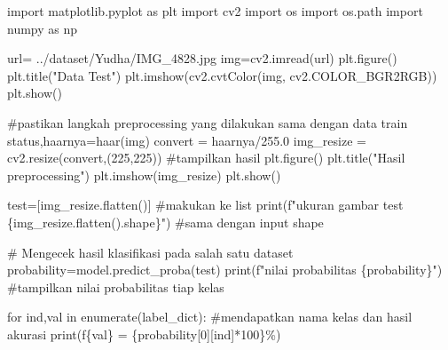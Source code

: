 \documentclass[
  letterpaper,
  DIV=11,
  numbers=noendperiod]{scrreprt}
\newenvironment{Shaded}{\begin{snugshade}}{\end{snugshade}}
\newcommand{\BuiltInTok}[1]{\textcolor[rgb]{0.00,0.23,0.31}{#1}}
\newcommand{\CommentTok}[1]{\textcolor[rgb]{0.37,0.37,0.37}{#1}}
\newcommand{\ControlFlowTok}[1]{\textcolor[rgb]{0.00,0.23,0.31}{#1}}
\newcommand{\DecValTok}[1]{\textcolor[rgb]{0.68,0.00,0.00}{#1}}
\newcommand{\FloatTok}[1]{\textcolor[rgb]{0.68,0.00,0.00}{#1}}
\newcommand{\ImportTok}[1]{\textcolor[rgb]{0.00,0.46,0.62}{#1}}
\newcommand{\KeywordTok}[1]{\textcolor[rgb]{0.00,0.23,0.31}{#1}}
\newcommand{\NormalTok}[1]{\textcolor[rgb]{0.00,0.23,0.31}{#1}}
\newcommand{\OperatorTok}[1]{\textcolor[rgb]{0.37,0.37,0.37}{#1}}
\newcommand{\SpecialCharTok}[1]{\textcolor[rgb]{0.37,0.37,0.37}{#1}}
\newcommand{\SpecialStringTok}[1]{\textcolor[rgb]{0.13,0.47,0.30}{#1}}
\newcommand{\StringTok}[1]{\textcolor[rgb]{0.13,0.47,0.30}{#1}}
\begin{document}
\begin{Shaded}
\begin{Highlighting}[]
\ImportTok{import}\NormalTok{ matplotlib.pyplot }\ImportTok{as}\NormalTok{ plt}
\ImportTok{import}\NormalTok{ cv2}
\ImportTok{import}\NormalTok{ os}
\ImportTok{import}\NormalTok{ os.path}
\ImportTok{import}\NormalTok{ numpy }\ImportTok{as}\NormalTok{ np}

\NormalTok{url}\OperatorTok{=} \StringTok{\textquotesingle{}../dataset/Yudha/IMG\_4828.jpg\textquotesingle{}}
\NormalTok{img}\OperatorTok{=}\NormalTok{cv2.imread(url)}
\NormalTok{plt.figure()}
\NormalTok{plt.title(}\StringTok{"Data Test"}\NormalTok{)}
\NormalTok{plt.imshow(cv2.cvtColor(img, cv2.COLOR\_BGR2RGB))}
\NormalTok{plt.show()}

\CommentTok{\#pastikan langkah preprocessing yang dilakukan sama dengan data train}
\NormalTok{status,haarnya}\OperatorTok{=}\NormalTok{haar(img)}
\NormalTok{convert }\OperatorTok{=}\NormalTok{ haarnya}\OperatorTok{/}\FloatTok{255.0}
\NormalTok{img\_resize }\OperatorTok{=}\NormalTok{ cv2.resize(convert,(}\DecValTok{225}\NormalTok{,}\DecValTok{225}\NormalTok{))}
\CommentTok{\#tampilkan hasil}
\NormalTok{plt.figure()}
\NormalTok{plt.title(}\StringTok{"Hasil preprocessing"}\NormalTok{)}
\NormalTok{plt.imshow(img\_resize)}
\NormalTok{plt.show()}



\NormalTok{test}\OperatorTok{=}\NormalTok{[img\_resize.flatten()] }\CommentTok{\#makukan ke list}
\BuiltInTok{print}\NormalTok{(}\SpecialStringTok{f"ukuran gambar test }\SpecialCharTok{\{}\NormalTok{img\_resize}\SpecialCharTok{.}\NormalTok{flatten()}\SpecialCharTok{.}\NormalTok{shape}\SpecialCharTok{\}}\SpecialStringTok{"}\NormalTok{) }\CommentTok{\#sama dengan input shape}

\CommentTok{\# Mengecek hasil klasifikasi pada salah satu dataset}
\NormalTok{probability}\OperatorTok{=}\NormalTok{model.predict\_proba(test)}
\BuiltInTok{print}\NormalTok{(}\SpecialStringTok{f"nilai probabilitas }\SpecialCharTok{\{}\NormalTok{probability}\SpecialCharTok{\}}\SpecialStringTok{"}\NormalTok{) }\CommentTok{\#tampilkan nilai probabilitas tiap kelas}



\ControlFlowTok{for}\NormalTok{ ind,val }\KeywordTok{in} \BuiltInTok{enumerate}\NormalTok{(label\_dict): }\CommentTok{\#mendapatkan nama kelas dan hasil akurasi}
    \BuiltInTok{print}\NormalTok{(}\SpecialStringTok{f\textquotesingle{}}\SpecialCharTok{\{}\NormalTok{val}\SpecialCharTok{\}}\SpecialStringTok{ = }\SpecialCharTok{\{}\NormalTok{probability[}\DecValTok{0}\NormalTok{][ind]}\OperatorTok{*}\DecValTok{100}\SpecialCharTok{\}}\SpecialStringTok{\%\textquotesingle{}}\NormalTok{)}
    

\end{Highlighting}
\end{Shaded}
\end{document}
